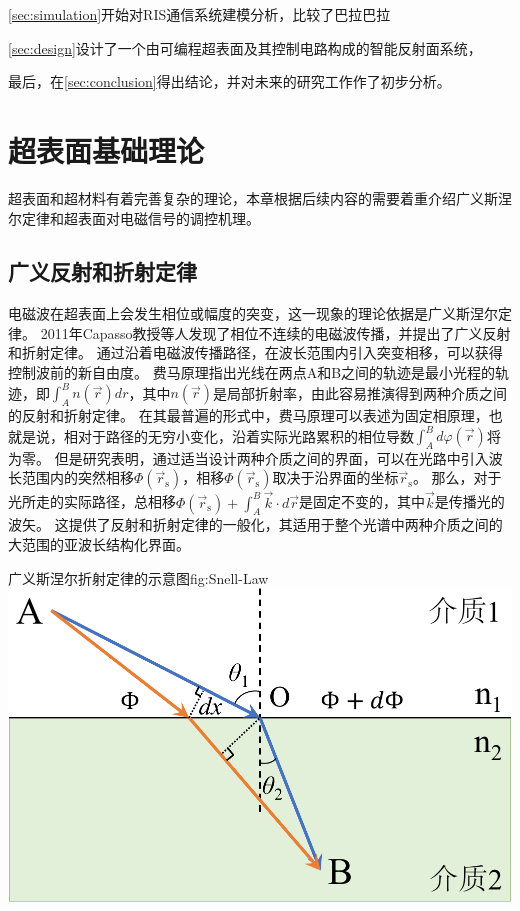 \documentclass[supercite]{HustGraduPaper}
\begin{document}
\autoref{sec:simulation}开始对RIS通信系统建模分析，比较了巴拉巴拉

\autoref{sec:design}设计了一个由可编程超表面及其控制电路构成的智能反射面系统，

最后，在\autoref{sec:conclusion}得出结论，并对未来的研究工作作了初步分析。

\section{超表面基础理论}\label{sec:theory}

超表面和超材料有着完善复杂的理论，本章根据后续内容的需要着重介绍广义斯涅尔定律和超表面对电磁信号的调控机理。

\subsection{广义反射和折射定律}\label{subsec:snell-law}

电磁波在超表面上会发生相位或幅度的突变，这一现象的理论依据是广义斯涅尔定律\cite{9326394}。
2011年Capasso教授等人发现了相位不连续的电磁波传播，并提出了广义反射和折射定律\cite{yu2011light}。
通过沿着电磁波传播路径，在波长范围内引入突变相移，可以获得控制波前的新自由度。
费马原理指出光线在两点A和B之间的轨迹是最小光程的轨迹，即$ \int_{A}^{B} n(\vec{r}) dr $，其中$ n(\vec{r}) $是局部折射率，由此容易推演得到两种介质之间的反射和折射定律。
在其最普遍的形式中，费马原理可以表述为固定相原理\cite{feynman2010quantum}，也就是说，相对于路径的无穷小变化，沿着实际光路累积的相位导数$ \int_{A}^{B} d \varphi (\vec{r}) $将为零。
但是研究表明，通过适当设计两种介质之间的界面，可以在光路中引入波长范围内的突然相移$ \Phi (\vec{r}_\mathrm{s}) $，相移$ \Phi (\vec{r}_\mathrm{s}) $取决于沿界面的坐标$ \vec{r}_\mathrm{s} $。
那么，对于光所走的实际路径，总相移$ \Phi\left(\vec{r}_{\mathrm{s}}\right)+\int_{A}^{B} \vec{k} \cdot d \vec{r} $是固定不变的，其中$ \vec{k} $是传播光的波矢。
这提供了反射和折射定律的一般化，其适用于整个光谱中两种介质之间的大范围的亚波长结构化界面。

\begin{generalfig}[htb]{广义斯涅尔折射定律的示意图}{fig:Snell-Law}
	\includegraphics[width=0.5\linewidth]{Figures/Snell-Law.pdf}
\end{generalfig}
\end{document}
